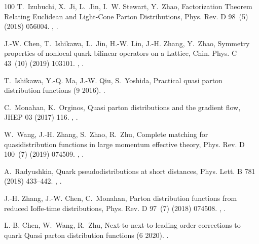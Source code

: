 \begin{thebibliography}{100}
T.~Izubuchi, X.~Ji, L.~Jin, I.~W. Stewart, Y.~Zhao, {Factorization Theorem
  Relating Euclidean and Light-Cone Parton Distributions}, Phys. Rev. D 98~(5)
  (2018) 056004.
\newblock \href {http://arxiv.org/abs/1801.03917} {},
  \href {https://doi.org/10.1103/PhysRevD.98.056004}
  {}.

J.-W. Chen, T.~Ishikawa, L.~Jin, H.-W. Lin, J.-H. Zhang, Y.~Zhao, {Symmetry
  properties of nonlocal quark bilinear operators on a Lattice}, Chin. Phys. C
  43~(10) (2019) 103101.
\newblock \href {http://arxiv.org/abs/1710.01089} {},
  \href {https://doi.org/10.1088/1674-1137/43/10/103101}
  {}.

T.~Ishikawa, Y.-Q. Ma, J.-W. Qiu, S.~Yoshida, {Practical quasi parton
  distribution functions} (9 2016).
\newblock \href {http://arxiv.org/abs/1609.02018} {}.

C.~Monahan, K.~Orginos, {Quasi parton distributions and the gradient flow},
  JHEP 03 (2017) 116.
\newblock \href {http://arxiv.org/abs/1612.01584} {},
  \href {https://doi.org/10.1007/JHEP03(2017)116}
  {}.

W.~Wang, J.-H. Zhang, S.~Zhao, R.~Zhu, {Complete matching for quasidistribution
  functions in large momentum effective theory}, Phys. Rev. D 100~(7) (2019)
  074509.
\newblock \href {http://arxiv.org/abs/1904.00978} {},
  \href {https://doi.org/10.1103/PhysRevD.100.074509}
  {}.

A.~Radyushkin, {Quark pseudodistributions at short distances}, Phys. Lett. B
  781 (2018) 433--442.
\newblock \href {http://arxiv.org/abs/1710.08813} {},
  \href {https://doi.org/10.1016/j.physletb.2018.04.023}
  {}.

J.-H. Zhang, J.-W. Chen, C.~Monahan, {Parton distribution functions from
  reduced Ioffe-time distributions}, Phys. Rev. D 97~(7) (2018) 074508.
\newblock \href {http://arxiv.org/abs/1801.03023} {},
  \href {https://doi.org/10.1103/PhysRevD.97.074508}
  {}.

L.-B. Chen, W.~Wang, R.~Zhu, {Next-to-next-to-leading order corrections to
  quark Quasi parton distribution functions} (6 2020).
\newblock \href {http://arxiv.org/abs/2006.14825} {}.


\end{thebibliography}
